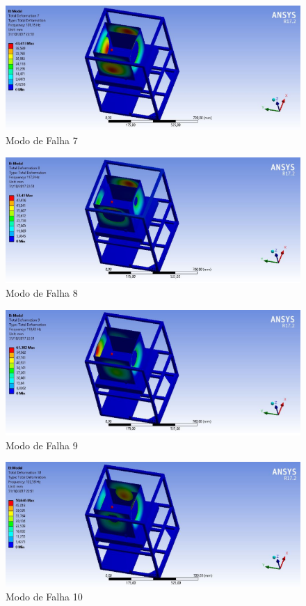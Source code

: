 \begin{figure}[H]
\centering
\includegraphics[width=16cm]{figuras/mododefalha7.png}
\caption{Modo de Falha 7}
\end{figure}

\begin{figure}[H]
\centering
\includegraphics[width=16cm]{figuras/mododefalha8.png}
\caption{Modo de Falha 8}
\end{figure}

\begin{figure}[H]
\centering
\includegraphics[width=16cm]{figuras/mododefalha9.png}
\caption{Modo de Falha 9}
\end{figure}

\begin{figure}[H]
\centering
\includegraphics[width=16cm]{figuras/mododefalha10.png}
\caption{Modo de Falha 10}
\end{figure}


